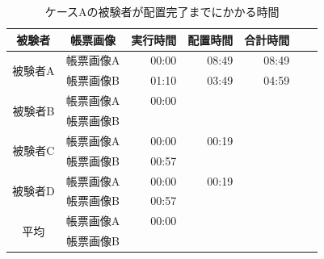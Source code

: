 \begin{table}[t]
	\caption{ケースAの被験者が配置完了までにかかる時間}
	\label{tb:result_accuracy}
	\centering
	\begin{tabular}{cc||rrrr|r}
		被験者 & 帳票画像 & 実行時間 & 配置時間 & 合計時間 \\
        \hline \hline

		\multirow{2}{*}{被験者A} & 帳票画像A & 00:00 & 08:49 & 08:49 \\
		                        & 帳票画像B & 01:10 & 03:49 & 04:59 \\
                                \hline

		\multirow{2}{*}{被験者B} & 帳票画像A & 00:00 &  &  \\
                                & 帳票画像B &  &  &  \\
                                \hline

		\multirow{2}{*}{被験者C} & 帳票画像A & 00:00 & 00:19 &  \\
                                & 帳票画像B & 00:57 &  &  \\
                                \hline

		\multirow{2}{*}{被験者D} & 帳票画像A & 00:00 & 00:19 &  \\
                                & 帳票画像B & 00:57 &  &  \\
                                \hline \hline

		\multirow{2}{*}{平均}  & 帳票画像A & 00:00 &  &  \\
                              & 帳票画像B &  &  &  \\
	\end{tabular}
\end{table}

